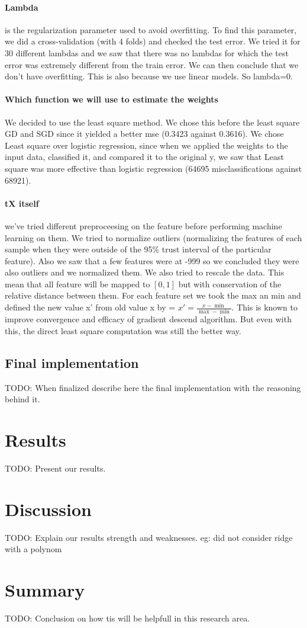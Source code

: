 \documentclass[10pt,conference,compsocconf]{IEEEtran}
\begin{document}
\paragraph{Lambda} is the regularization parameter used to avoid overfitting. To find this parameter, we did a cross-validation (with 4 folds) and checked the test error. We tried it for 30 different lambdas and we saw that there was no lambdas for which the test error was extremely different from the train error. We can then conclude that we don’t have overfitting. This is also because we use linear models. So lambda=0.
\paragraph{Which function we will use to estimate the weights} We decided to use the least square method. We chose this before the least square GD and SGD since it yielded a better mse (0.3423 against 0.3616). We chose Least square over logistic regression, since when we applied the weights to the input data, classified it, and compared it to the original y, we saw that Least square was more effective than logistic regression (64695 misclassifications against 68921).
\paragraph{tX itself} we've tried different preproceesing on the feature before performing machine learning on them. We tried to normalize outliers (normalizing the features of each sample when they were outside of the 95\% trust interval of the particular feature). Also we saw that a few features were at -999 so we concluded they were also outliers and we normalized them.
We also tried to rescale the data. This mean that all feature will be  mapped to \( [0,1] \) but with conservation of the relative distance between them. For each feature set we took the max an min and defined the new value x' from old value x by = \( x' = \frac{x-\min}{\max - \min }\). This is known to improve convergence and efficacy of gradient descend algorithm. But even with this, the direct least square computation was still the better way.
\subsection{Final implementation}

TODO: When finalized describe here the final implementation with the reasoning behind it.

\section{Results}
TODO: Present our results.

\section{Discussion}
TODO: Explain our results strength and weaknesses.
eg: did not consider ridge with a polynom

\section{Summary}
TODO: Conclusion on how tis will be helpfull in this research area.



\end{document}
